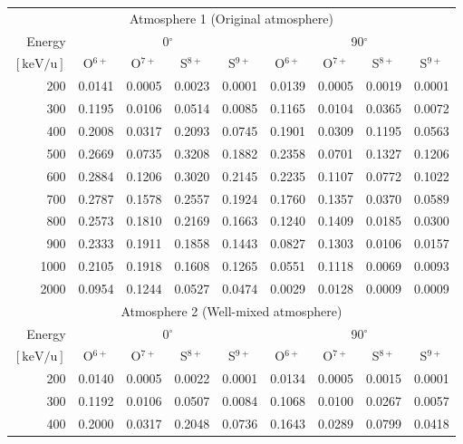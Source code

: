 \documentclass[draft]{agujournal2018}
\begin{document}
\begin{table}
    \centering
    \begin{tabular}{r|c|c|c|c|c|c|c|c}
    \multicolumn{9}{c}{Atmosphere 1 (Original atmosphere)} \\ \cline{2-9}
    Energy  & \multicolumn{4}{c|}{0$^\circ$} & \multicolumn{4}{c}{90$^\circ$} \\ \cline{2-9}
    $\mathrm{[keV/u]}$ & O$^{6+}$ & O$^{7+}$ & S$^{8+}$ & S$^{9+}$ & O$^{6+}$ & O$^{7+}$ & S$^{8+}$ & S$^{9+}$ \\ \cline{1-9}
    200      & 0.0141 & 0.0005 & 0.0023 & 0.0001 & 0.0139 & 0.0005 & 0.0019 & 0.0001 \\
    300      & 0.1195 & 0.0106 & 0.0514 & 0.0085 & 0.1165 & 0.0104 & 0.0365 & 0.0072 \\
    400      & 0.2008 & 0.0317 & 0.2093 & 0.0745 & 0.1901 & 0.0309 & 0.1195 & 0.0563 \\
    500      & 0.2669 & 0.0735 & 0.3208 & 0.1882 & 0.2358 & 0.0701 & 0.1327 & 0.1206 \\
    600      & 0.2884 & 0.1206 & 0.3020 & 0.2145 & 0.2235 & 0.1107 & 0.0772 & 0.1022 \\
    700      & 0.2787 & 0.1578 & 0.2557 & 0.1924 & 0.1760 & 0.1357 & 0.0370 & 0.0589 \\
    800      & 0.2573 & 0.1810 & 0.2169 & 0.1663 & 0.1240 & 0.1409 & 0.0185 & 0.0300 \\
    900      & 0.2333 & 0.1911 & 0.1858 & 0.1443 & 0.0827 & 0.1303 & 0.0106 & 0.0157 \\
    1000     & 0.2105 & 0.1918 & 0.1608 & 0.1265 & 0.0551 & 0.1118 & 0.0069 & 0.0093 \\
    2000     & 0.0954 & 0.1244 & 0.0527 & 0.0474 & 0.0029 & 0.0128 & 0.0009 & 0.0009 \\
    \hline
    \multicolumn{9}{c}{Atmosphere 2 (Well-mixed atmosphere)} \\ \cline{2-9}
    Energy  & \multicolumn{4}{c|}{0$^\circ$} & \multicolumn{4}{c}{90$^\circ$} \\ \cline{2-9}
    $\mathrm{[keV/u]}$ & O$^{6+}$ & O$^{7+}$ & S$^{8+}$ & S$^{9+}$ & O$^{6+}$ & O$^{7+}$ & S$^{8+}$ & S$^{9+}$ \\ \cline{1-9}
    200      & 0.0140 & 0.0005 & 0.0022	& 0.0001 & 0.0134 & 0.0005 & 0.0015 & 0.0001 \\
    300      & 0.1192 & 0.0106 & 0.0507	& 0.0084 & 0.1068 & 0.0100 & 0.0267 & 0.0057 \\
    400      & 0.2000 & 0.0317 & 0.2048	& 0.0736 & 0.1643 & 0.0289 & 0.0799 & 0.0418 \\

\end{tabular}
\end{table}
\end{document}
